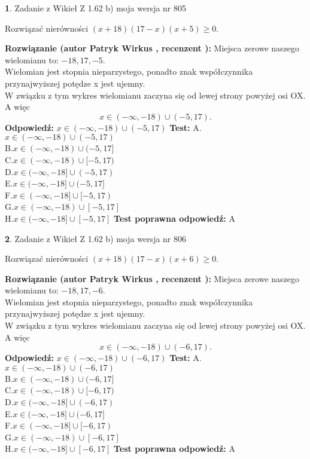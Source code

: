 \documentclass[12pt, a4paper]{article}
\theoremstyle{definition} %
\newtheorem{zad}{}
\newcommand{\zadStart}[1]{\begin{zad}#1\newline}
\newcommand{\zadStop}{\end{zad}}
\newcommand{\rozwStart}[2]{\noindent \textbf{Rozwiązanie (autor #1 , recenzent #2): }\newline}
\newcommand{\rozwStop}{\newline}
\newcommand{\odpStart}{\noindent \textbf{Odpowiedź:}\newline}
\newcommand{\odpStop}{\newline}
\newcommand{\testStart}{\noindent \textbf{Test:}\newline}
\newcommand{\testStop}{\newline}
\newcommand{\kluczStart}{\noindent \textbf{Test poprawna odpowiedź:}\newline}
\newcommand{\kluczStop}{\newline}
\begin{document}
\zadStart{Zadanie z Wikieł Z 1.62 b) moja wersja nr 805}

Rozwiązać nierówności $(x+18)(17-x)(x+5)\ge0$.
\zadStop
\rozwStart{Patryk Wirkus}{}
Miejsca zerowe naszego wielomianu to: $-18, 17, -5$.\\
Wielomian jest stopnia nieparzystego, ponadto znak współczynnika przy\linebreak najwyższej potędze x jest ujemny.\\ W związku z tym wykres wielomianu zaczyna się od lewej strony powyżej osi OX. A więc $$x \in (-\infty,-18) \cup (-5,17).$$
\rozwStop
\odpStart
$x \in (-\infty,-18) \cup (-5,17)$
\odpStop
\testStart
A.$x \in (-\infty,-18) \cup (-5,17)$\\
B.$x \in (-\infty,-18) \cup (-5,17]$\\
C.$x \in (-\infty,-18) \cup [-5,17)$\\
D.$x \in (-\infty,-18] \cup (-5,17)$\\
E.$x \in (-\infty,-18] \cup (-5,17]$\\
F.$x \in (-\infty,-18] \cup [-5,17)$\\
G.$x \in (-\infty,-18) \cup [-5,17]$\\
H.$x \in (-\infty,-18] \cup [-5,17]$
\testStop
\kluczStart
A
\kluczStop



\zadStart{Zadanie z Wikieł Z 1.62 b) moja wersja nr 806}

Rozwiązać nierówności $(x+18)(17-x)(x+6)\ge0$.
\zadStop
\rozwStart{Patryk Wirkus}{}
Miejsca zerowe naszego wielomianu to: $-18, 17, -6$.\\
Wielomian jest stopnia nieparzystego, ponadto znak współczynnika przy\linebreak najwyższej potędze x jest ujemny.\\ W związku z tym wykres wielomianu zaczyna się od lewej strony powyżej osi OX. A więc $$x \in (-\infty,-18) \cup (-6,17).$$
\rozwStop
\odpStart
$x \in (-\infty,-18) \cup (-6,17)$
\odpStop
\testStart
A.$x \in (-\infty,-18) \cup (-6,17)$\\
B.$x \in (-\infty,-18) \cup (-6,17]$\\
C.$x \in (-\infty,-18) \cup [-6,17)$\\
D.$x \in (-\infty,-18] \cup (-6,17)$\\
E.$x \in (-\infty,-18] \cup (-6,17]$\\
F.$x \in (-\infty,-18] \cup [-6,17)$\\
G.$x \in (-\infty,-18) \cup [-6,17]$\\
H.$x \in (-\infty,-18] \cup [-6,17]$
\testStop
\kluczStart
A
\kluczStop
\end{document}
